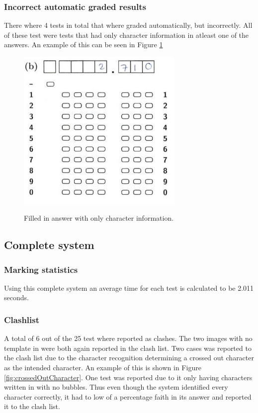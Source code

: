 \subsubsection{Incorrect automatic graded results}

There where 4 tests in total that where graded automatically, but incorrectly. All of these test were tests that had only character information in atleast one of the answers. An example of this can be seen in Figure \ref{fig:OnlyCharacters}

\begin{figure}
  \centering
  \includegraphics[width=8cm]{OnlyCharacters}\\
  \caption{Filled in answer with only character information.}
  \label{fig:OnlyCharacters}
\end{figure}

\subsection{Complete system}

\subsubsection{Marking statistics}

Using this complete system an average time for each test is calculated to be 2.011 seconds. 

\subsubsection{Clashlist}

A total of 6 out of the 25 test where reported as clashes. The two images with no template in were both again reported in the clash list. Two cases was reported to the clash list due to the character recognition determining a crossed out character as the intended character. An example of this is shown in Figure \ref{fig:crossedOutCharacter}. One test was reported due to it only having characters written in with no bubbles. Thus even though the system identified every character correctly, it had to low of a percentage faith in its answer and reported it to the clash list. 

